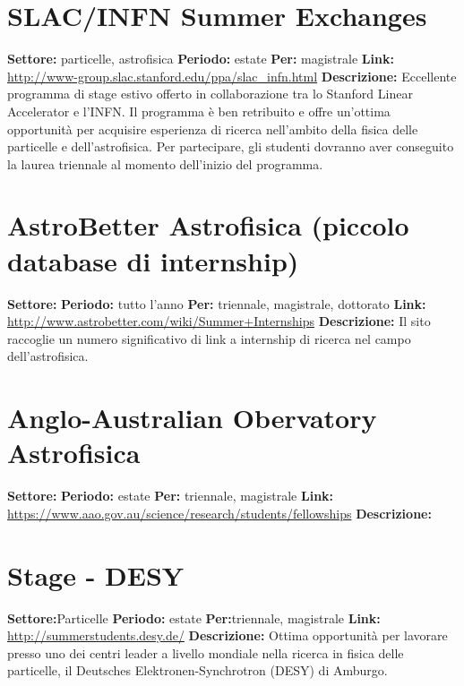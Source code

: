 \documentclass[a4paper,10pt]{article}
\begin{document}
{\section{SLAC/INFN Summer Exchanges}
\textbf{Settore:} particelle, astrofisica\newline
\textbf{Periodo:} estate \newline
\textbf{Per:} magistrale\newline
\textbf{Link:} \url{http://www-group.slac.stanford.edu/ppa/slac_infn.html} \newline
\textbf{Descrizione:} Eccellente programma di stage estivo offerto in collaborazione tra lo Stanford Linear Accelerator e l'INFN. Il programma è ben retribuito e offre un'ottima opportunità per acquisire esperienza di ricerca nell'ambito della fisica delle particelle e dell'astrofisica. Per partecipare, gli studenti dovranno aver conseguito la laurea triennale al momento dell'inizio del programma.  

\section{AstroBetter  Astrofisica (piccolo database di internship)}
\textbf{Settore:} \newline
\textbf{Periodo:} tutto l'anno\newline
\textbf{Per:} triennale, magistrale, dottorato\newline
\textbf{Link:} \url{http://www.astrobetter.com/wiki/Summer+Internships} \newline
\textbf{Descrizione:} Il sito raccoglie un numero significativo di link a internship di ricerca nel campo dell'astrofisica. 

\section{Anglo-Australian Obervatory Astrofisica}
\textbf{Settore:} \newline
\textbf{Periodo:} estate\newline
\textbf{Per:} triennale, magistrale\newline
\textbf{Link:} \url{https://www.aao.gov.au/science/research/students/fellowships} \newline
\textbf{Descrizione:}   

\section{ Stage - DESY}
\textbf{Settore:}Particelle \newline
\textbf{Periodo:} estate\newline
\textbf{Per:}triennale, magistrale\newline
\textbf{Link:} \url{http://summerstudents.desy.de/} \newline
\textbf{Descrizione:}   Ottima opportunità per lavorare presso uno dei centri leader a livello mondiale nella ricerca in fisica delle particelle, il Deutsches Elektronen-Synchrotron (DESY) di Amburgo.  

}
\end{document}

